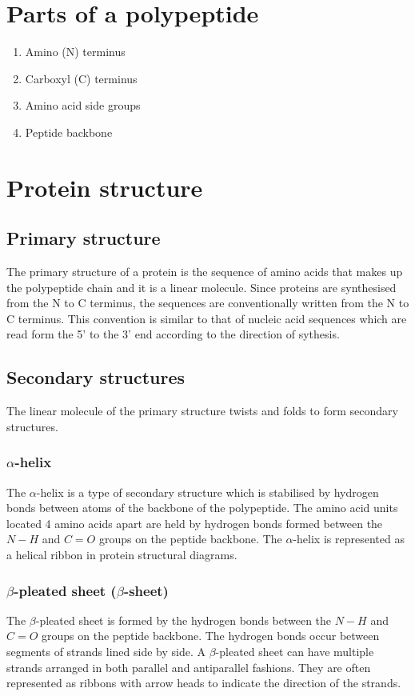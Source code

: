 \documentclass[11pt]{article}
\begin{document}
\section{Parts of a polypeptide}
\label{sec:orga741480}
\begin{enumerate}
\item Amino (N) terminus
\item Carboxyl (C) terminus
\item Amino acid side groups
\item Peptide backbone
\end{enumerate}
\section{Protein structure}
\label{sec:org39367ba}

\subsection{Primary structure}
\label{sec:org84f9239}
The primary structure of a protein is the sequence of amino acids that makes up the polypeptide chain and it is a linear molecule. Since proteins are synthesised from the N to C terminus, the sequences are conventionally written from the N to C terminus. This convention is similar to that of nucleic acid sequences which are read form the 5' to the 3' end according to the direction of sythesis.
\subsection{Secondary structures}
\label{sec:orgb7dc0bc}
The linear molecule of the primary structure twists and folds to form secondary structures.
\subsubsection{\(\alpha\)-helix}
\label{sec:org7b1e4c1}
The \(\alpha\)-helix is a type of secondary structure which is stabilised by hydrogen bonds between atoms of the backbone of the polypeptide. The amino acid units located 4 amino acids apart are held by hydrogen bonds formed between the \(N-H\) and \(C=O\) groups on the peptide backbone. The \(\alpha\)-helix is represented as a helical ribbon in protein structural diagrams.
\subsubsection{\(\beta\)-pleated sheet (\(\beta\)-sheet)}
\label{sec:org0177392}
The \(\beta\)-pleated sheet is formed by the hydrogen bonds between the \(N-H\) and \(C=O\) groups on the peptide backbone. The hydrogen bonds occur between segments of strands lined side by side. A \(\beta\)-pleated sheet can have multiple strands arranged in both parallel and antiparallel fashions. They are often represented as ribbons with arrow heads to indicate the direction of the strands.
\end{document}
